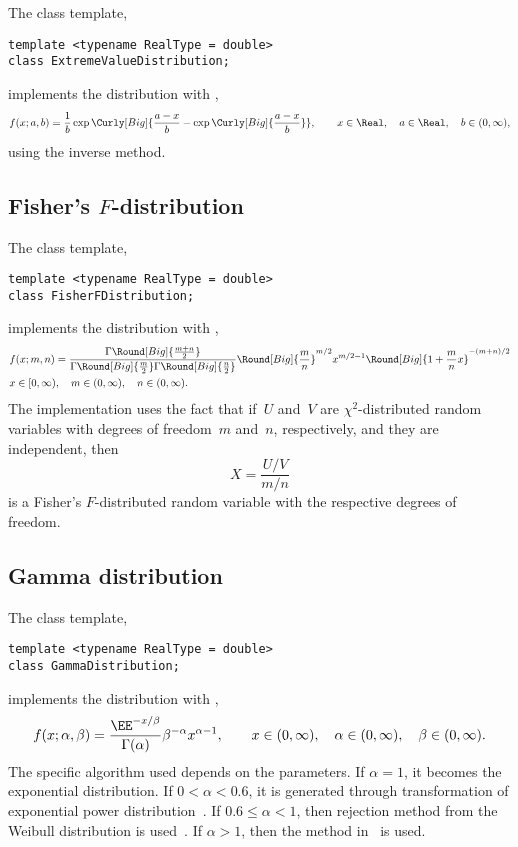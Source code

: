 The class template,
\begin{verbatim}
template <typename RealType = double>
class ExtremeValueDistribution;
\end{verbatim}
implements the distribution with \pdf,
\begin{equation*}
  f(x;a,b) =
  \frac{1}{b}\exp\Curly[Big]{
    \frac{a - x}{b} - \exp\Curly[Big]{\frac{a - x}{b}}},\qquad
  x \in \Real,\quad a \in \Real,\quad b \in (0, \infty),
\end{equation*}
using the inverse method.

\subsection{Fisher's \texorpdfstring{$F$}{F}-distribution}
\label{sub:Fisher's F-distribution}

The class template,
\begin{verbatim}
template <typename RealType = double>
class FisherFDistribution;
\end{verbatim}
implements the distribution with \pdf,
\begin{align*}
  & f(x;m,n) =
  \frac{\Gamma\Round[Big]{\frac{m + n}{2}}}{
    \Gamma\Round[Big]{\frac{m}{2}}\Gamma\Round[Big]{\frac{n}{2}}}
  \Round[Big]{\frac{m}{n}}^{m/2} x^{m / 2 - 1}
  \Round[Big]{1 + \frac{m}{n}x}^{-(m + n) / 2} \\
  & x \in [0, \infty),\quad m \in (0, \infty),\quad n \in (0, \infty).
\end{align*}
The implementation uses the fact that if~$U$ and~$V$ are $\chi^2$-distributed
random variables with degrees of freedom~$m$ and~$n$, respectively, and they
are independent, then
\begin{equation*}
  X = \frac{U / V}{m / n}
\end{equation*}
is a Fisher's $F$-distributed random variable with the respective degrees of
freedom.

\subsection{Gamma distribution}
\label{sub:Gamma distribution}

The class template,
\begin{verbatim}
template <typename RealType = double>
class GammaDistribution;
\end{verbatim}
implements the distribution with \pdf,
\begin{equation*}
  f(x;\alpha,\beta) =
  \frac{\EE^{-x/\beta}}{\Gamma(\alpha)}\beta^{-\alpha}x^{\alpha-1},\qquad
  x \in (0, \infty),\quad \alpha \in (0, \infty),\quad \beta \in (0, \infty).
\end{equation*}
The specific algorithm used depends on the parameters. If $\alpha = 1$, it
becomes the exponential distribution. If $0 < \alpha < 0.6$, it is generated
through transformation of exponential power
distribution~\cite[sec~2.6]{Devroye:1986gi}. If $0.6\le\alpha<1$, then
rejection method from the Weibull distribution is
used~\cite[sec.~3.4]{Devroye:1986gi}. If $\alpha > 1$, then the method
in~\cite{Marsaglia:2000vq} is used.

